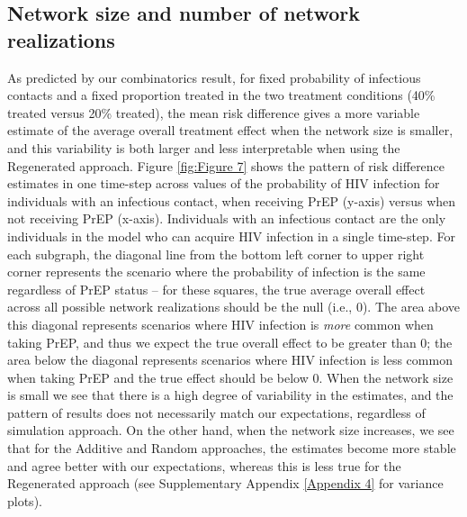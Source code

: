 \documentclass{article}
\theoremstyle{definition}
\begin{document}
\subsection{Network size and number of network realizations}
As predicted by our combinatorics result, for fixed probability of infectious contacts and a fixed proportion treated in the two treatment conditions (40\% treated versus 20\% treated), the mean risk difference gives a more variable estimate of the average overall treatment effect when the network size is smaller, and this variability is both larger and less interpretable when using the Regenerated approach. Figure \ref{fig:Figure 7} shows the pattern of risk difference estimates in one time-step across values of the probability of HIV infection for individuals with an infectious contact, when receiving PrEP (y-axis) versus when not receiving PrEP (x-axis). Individuals with an infectious contact are the only individuals in the model who can acquire HIV infection in a single time-step. For each subgraph, the diagonal line from the bottom left corner to upper right corner represents the scenario where the probability of infection is the same regardless of PrEP status -- for these squares, the true average overall effect across all possible network realizations should be the null (i.e., 0). The area above this diagonal represents scenarios where HIV infection is \textit{more} common when taking PrEP, and thus we expect the true overall effect to be greater than 0; the area below the diagonal represents scenarios where HIV infection is less common when taking PrEP and the true effect should be below 0. When the network size is small we see that there is a high degree of variability in the estimates, and the pattern of results does not necessarily match our expectations, regardless of simulation approach. On the other hand, when the network size increases, we see that for the Additive and Random approaches, the estimates become more stable and agree better with our expectations, whereas this is less true for the Regenerated approach (see Supplementary Appendix \ref{Appendix 4} for variance plots). 
\end{document}
